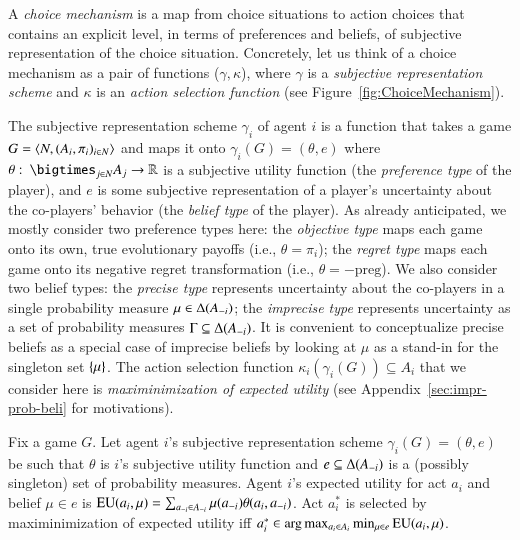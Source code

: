 \documentclass[fleqn,reqno,11pt]{article}
\begin{document}
A \emph{choice mechanism} is a map from choice situations to action choices that contains an explicit level, in terms of preferences and beliefs, of subjective representation of
the choice situation. Concretely, let us think of a choice mechanism as a pair of functions
($\gamma,\kappa$), where $\gamma$ is a \emph{subjective representation scheme} and $\kappa$ is
an \emph{action selection function} (see Figure~\ref{fig:ChoiceMechanism}).

The subjective representation scheme $\gamma_i$ of agent $i$ is a function that
takes a game $G = \left \langle  N, (A_i , \pi_i)_{i \in N} \right\rangle$ and maps it onto
$\gamma_i(G) = (\theta, e)$ where
$\theta \mycolon \bigtimes_{j \in N} A_j \rightarrow \mathbb{R}$ is a subjective utility function (the \emph{preference type} of the player), and $e$ is some subjective representation of a player's uncertainty about the co-players'
behavior (the \emph{belief type} of the player). As already anticipated, we mostly consider two preference types here: the \emph{objective type} maps each game
onto its own, true evolutionary payoffs (i.e., $ \theta = \pi_i $); the \emph{regret type} maps each game onto its negative regret
transformation (i.e., $ \theta = -\text{preg} $). We also consider two belief types: the
\emph{precise type} represents uncertainty about the co-players in a single probability measure
$\mu \in \Delta(A_{-i})$; the \emph{imprecise type}
represents uncertainty as a set of probability measures $\Gamma \subseteq \Delta(A_{-i})$.
It is convenient to conceptualize precise beliefs as a special case of imprecise beliefs by
looking at $\mu$ as a stand-in for the singleton set $\left\{\mu\right\}$.
The action selection function $\kappa_i(\gamma_i(G)) \subseteq A_i$ that we consider here is \emph{maximinimization of expected utility} (see Appendix~\ref{sec:impr-prob-beli} for motivations).

\begin{definition}
  \label{def:maxminSEU}
  Fix a game $G$. Let agent $i$'s subjective representation scheme
  $\gamma_i(G) = (\theta, e)$ be such that $\theta$ is $i$'s subjective utility function and $e \subseteq \Delta(A_{-i})$ is a (possibly singleton) set of probability measures. Agent $i$'s expected utility for act $a_{i}$ and belief
  $\mu \in e$ is
  $\operatorname{EU}(a_{i}, \mu) = \sum_{a_{-i} \in A_{-i}} \mu(a_{-i}) \theta(a_{i},
  a_{-i})$.
  Act $a_{i}^*$ is selected by maximinimization of expected utility iff
  $a_{i}^* \in \arg \max_{a_{i} \in A_{i}} \min_{\mu \in e} \operatorname{EU}(a_{i}, \mu)$.
\end{definition}
\end{document}
